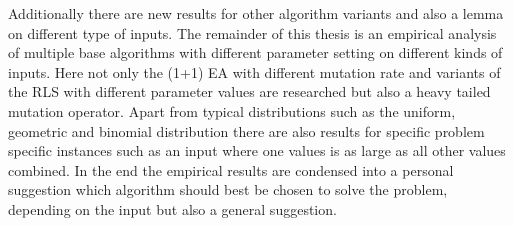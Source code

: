 Additionally there are new results for other algorithm variants and also a lemma on different type of inputs.
The remainder of this thesis is an empirical analysis of multiple base algorithms with different parameter setting on different kinds of inputs.
Here not only the (1+1) EA with different mutation rate and variants of the RLS with different parameter values are researched but also a heavy tailed mutation operator.
Apart from typical distributions such as the uniform, geometric and binomial distribution there are also results for specific problem specific instances such as an input where one values is as large as all other values combined.
In the end the empirical results are condensed into a personal suggestion which algorithm should best be chosen to solve the problem, depending on the input but also a general suggestion.

